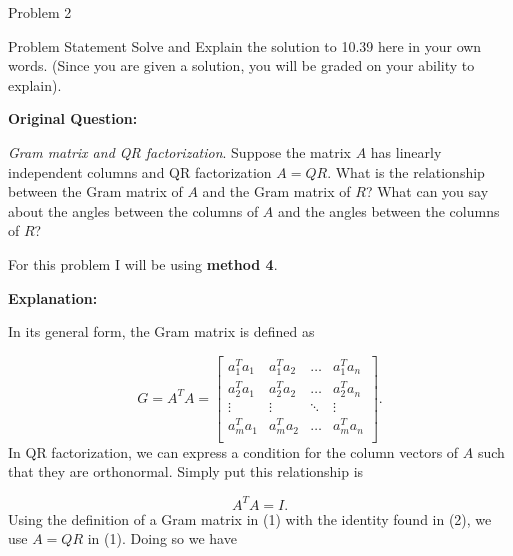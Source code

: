 \begin{problem}{Problem 2}
    \begin{statement}{Problem Statement}
        Solve and Explain the solution to 10.39  here in your own words. (Since you are given a solution, you will be graded on your ability to explain). \vspace*{1em}

        \noindent \textbf{Original Question:} \vspace*{1em}

        \textit{Gram matrix and QR factorization}. Suppose the matrix $A$ has linearly independent columns and QR factorization $A = QR$. What is the relationship between the Gram matrix of $A$ and 
        the Gram matrix of $R$? What can you say about the angles between the columns of $A$ and the angles between the columns of $R$?
    \end{statement}

    \begin{Highlight}[Solution]
        \noindent For this problem I will be using \textbf{method 4}. \vspace*{1em}

        \noindent \textbf{Explanation:} \vspace*{1em}

        In its general form, the Gram matrix is defined as 

        \setcounter{equation}{0}
        \begin{equation}
            G = A^{T}A = 
            \begin{bmatrix}
                a_{1}^{T}a_{1} & a_{1}^{T}a_{2} & \dots & a_{1}^{T}a_{n} \\
                a_{2}^{T}a_{1} & a_{2}^{T}a_{2} & \dots & a_{2}^{T}a_{n} \\
                \vdots & \vdots & \ddots & \vdots \\
                a_{m}^{T}a_{1} & a_{m}^{T}a_{2} & \dots & a_{m}^{T}a_{n} \\
            \end{bmatrix}.
        \end{equation}
        In QR factorization, we can express a condition for the column vectors of $A$ such that they are orthonormal. Simply put this relationship is 

        \begin{equation}
            A^{T}A = I.
        \end{equation}
        Using the definition of a Gram matrix in (1) with the identity found in (2), we use $A = QR$ in (1). Doing so we have 


\end{Highlight}
\end{problem}
